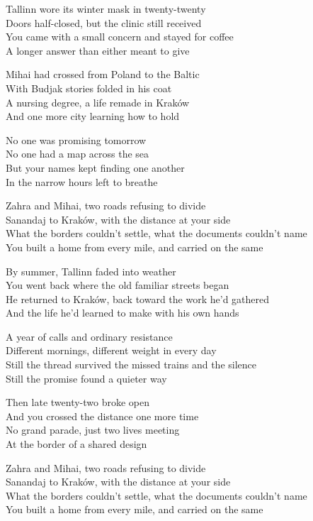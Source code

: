 \begin{lyrics}
Tallinn wore its winter mask in twenty-twenty\\
Doors half-closed, but the clinic still received\\
You came with a small concern and stayed for coffee\\
A longer answer than either meant to give

Mihai had crossed from Poland to the Baltic\\
With Budjak stories folded in his coat\\
A nursing degree, a life remade in Kraków\\
And one more city learning how to hold

No one was promising tomorrow\\
No one had a map across the sea\\
But your names kept finding one another\\
In the narrow hours left to breathe

Zahra and Mihai, two roads refusing to divide\\
Sanandaj to Kraków, with the distance at your side\\
What the borders couldn't settle, what the documents couldn't name\\
You built a home from every mile, and carried on the same

By summer, Tallinn faded into weather\\
You went back where the old familiar streets began\\
He returned to Kraków, back toward the work he'd gathered\\
And the life he'd learned to make with his own hands

A year of calls and ordinary resistance\\
Different mornings, different weight in every day\\
Still the thread survived the missed trains and the silence\\
Still the promise found a quieter way

Then late twenty-two broke open\\
And you crossed the distance one more time\\
No grand parade, just two lives meeting\\
At the border of a shared design

Zahra and Mihai, two roads refusing to divide\\
Sanandaj to Kraków, with the distance at your side\\
What the borders couldn't settle, what the documents couldn't name\\
You built a home from every mile, and carried on the same


\end{lyrics}
